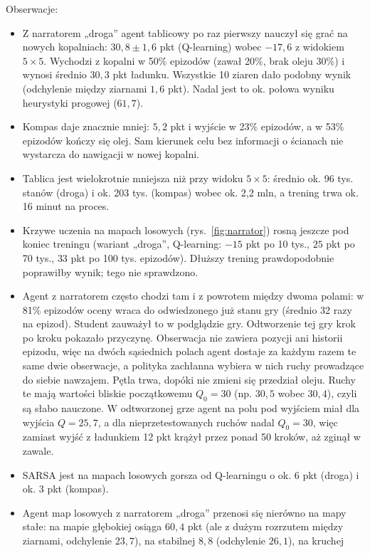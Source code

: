 \documentclass[11pt,a4paper]{article}
\begin{document}
Obserwacje:
\begin{itemize}
  \item Z narratorem „droga” agent tablicowy po raz pierwszy nauczył się grać na
  nowych kopalniach: $30{,}8\pm1{,}6$ pkt (Q-learning) wobec $-17{,}6$ z widokiem
  $5\times5$. Wychodzi z kopalni w 50\% epizodów (zawał 20\%, brak oleju 30\%)
  i wynosi średnio $30{,}3$ pkt ładunku. Wszystkie 10 ziaren dało podobny wynik
  (odchylenie między ziarnami $1{,}6$ pkt). Nadal jest to ok. połowa wyniku heurystyki
  progowej ($61{,}7$).
  \item Kompas daje znacznie mniej: $5{,}2$ pkt i wyjście w 23\% epizodów, a w 53\%
  epizodów kończy się olej. Sam kierunek celu bez informacji o ścianach nie
  wystarcza do nawigacji w nowej kopalni.
  \item Tablica jest wielokrotnie mniejsza niż przy widoku $5\times5$: średnio ok.
  96 tys. stanów (droga) i ok. 203 tys. (kompas) wobec ok. 2,2 mln, a trening trwa ok.
  16 minut na proces.
  \item Krzywe uczenia na mapach losowych (rys.~\ref{fig:narrator}) rosną jeszcze pod
  koniec treningu (wariant „droga”, Q-learning: $-15$ pkt po 10 tys., $25$ pkt po
  70 tys., $33$ pkt po 100 tys. epizodów). Dłuższy trening prawdopodobnie poprawiłby
  wynik; tego nie sprawdzono.
  \item Agent z narratorem często chodzi tam i z powrotem między dwoma polami:
  w 81\% epizodów oceny wraca do odwiedzonego już stanu gry (średnio 32 razy na
  epizod). Student zauważył to w podglądzie gry. Odtworzenie tej gry krok po kroku
  pokazało przyczynę. Obserwacja nie zawiera pozycji ani historii epizodu, więc na
  dwóch sąsiednich polach agent dostaje za każdym razem te same dwie obserwacje,
  a polityka zachłanna wybiera w nich ruchy prowadzące do siebie nawzajem. Pętla
  trwa, dopóki nie zmieni się przedział oleju. Ruchy te mają wartości bliskie
  początkowemu $Q_0=30$ (np. $30{,}5$ wobec $30{,}4$), czyli są słabo nauczone.
  W odtworzonej grze agent na polu pod wyjściem miał dla wyjścia $Q=25{,}7$,
  a dla nieprzetestowanych ruchów nadal $Q_0=30$, więc zamiast wyjść z ładunkiem
  12 pkt krążył przez ponad 50 kroków, aż zginął w zawale.
  \item SARSA jest na mapach losowych gorsza od Q-learningu o ok. 6 pkt (droga)
  i ok. 3 pkt (kompas).
  \item Agent map losowych z narratorem „droga” przenosi się nierówno na mapy stałe:
  na mapie głębokiej osiąga $60{,}4$ pkt (ale z dużym rozrzutem między ziarnami,
  odchylenie $23{,}7$), na stabilnej $8{,}8$ (odchylenie $26{,}1$), na kruchej

\end{itemize}
\end{document}
